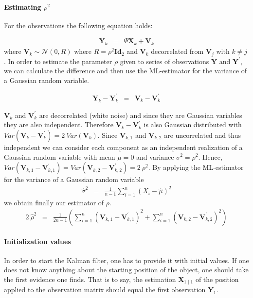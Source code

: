 \documentclass[a4paper, 12pt, titlepage]{article}
\begin{document}
\paragraph{Estimating $\rho^2$}

For the observations the following equation holds:

\begin{eqnarray}
	\pmb{Y}_k &=& \Psi \pmb{X}_k + \pmb{V}_k \label{eqn:2}
\end{eqnarray}
where $\pmb{V}_k \sim \mathcal{N}(0,R)$ where $R=\rho^2\pmb{Id}_{2}$ and $\pmb{V}_k$ decorrelated from $\pmb{V}_j$ with $k\not=j$.
In order to estimate the parameter $\rho$ given to series of observations $\pmb{Y}$ and $\pmb{Y}^{\prime}$, we can calculate the difference and then use the ML-estimator for the variance of a Gaussian random variable.

\begin{eqnarray}
	\pmb{Y}_k - \pmb{Y}^{\prime}_k &=& \pmb{V}_k - \pmb{V}_{k}^{\prime} \label{eqn:1}
\end{eqnarray}

$\pmb{V}_k$ and $\pmb{V}^{\prime}_k$ are decorrelated (white noise) and since they are Gaussian variables they are also independent.
Therefore $\pmb{V}_k - \pmb{V}_{k}^{\prime}$ is also Gaussian distributed with $Var(\pmb{V}_k - \pmb{V}_{k}^{\prime}) = 2\ Var(\pmb{V}_k)$.
Since $\pmb{V}_{k,1}$ and $\pmb{V}_{k,2}$ are uncorrelated and thus independent we can consider each component as an independent realization of a Gaussian random variable with mean $\mu=0$ and variance $\sigma^2=\rho^2$.
Hence, $Var(\pmb{V}_{k,1} - \pmb{V}_{k,1}^{\prime}) = Var(\pmb{V}_{k,2} - \pmb{V}_{k,2}^{\prime}) =2\ \rho^2$.
By applying the ML-estimator for the variance of a Gaussian random variable
\begin{eqnarray}
	\hat{\sigma}^2 &=& \frac{1}{n-1}\sum_{i=1}^{n}(X_{i}-\hat{\mu})^2
\end{eqnarray}
we obtain finally our estimator of $\rho$.
\begin{eqnarray}
	2\ \hat{\rho}^2 &=& \frac{1}{2n-1}\left(\sum_{i=1}^{n}(\pmb{V}_{k,1} - \pmb{V}_{k,1}^{\prime})^2 + \sum_{i=1}^{n}(\pmb{V}_{k,2} - \pmb{V}_{k,2}^{\prime})^2 \right)
\end{eqnarray}


\paragraph{Initialization values}

In order to start the Kalman filter, one has to provide it with initial values.
If one does not know anything about the starting position of the object, one should take the first evidence one finds.
That is to say, the estimation $\pmb{X}_{1\mid 1}$ of the position applied to the observation matrix should equal the first observation $\pmb{Y}_1$.
\end{document}
